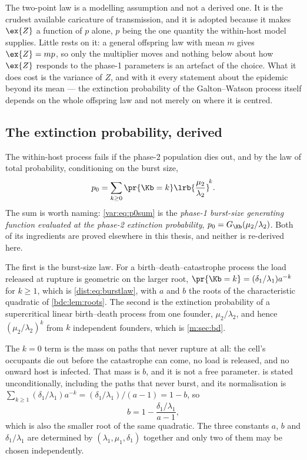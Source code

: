The two-point law is a modelling assumption and not a derived one. It is the
crudest available caricature of transmission, and it is adopted because it
makes $\ex{Z}$ a function of $p$ alone, $p$ being the one quantity the
within-host model supplies. Little rests on it: a general offspring law with
mean $m$ gives $\ex{Z}=mp$, so only the multiplier moves and nothing below
about how $\ex{Z}$ responds to the phase-1 parameters is an artefact of the
choice. What it does cost is the variance of $Z$, and with it every statement
about the epidemic beyond its mean --- the extinction probability of the
Galton--Watson process itself depends on the whole offspring law and not
merely on where it is centred.

\subsection{The extinction probability, derived}
\label{var:sec:extinction}

The within-host process fails if the phase-2 population dies out, and by the
law of total probability, conditioning on the burst size,
\begin{equation}
p_0=\sum_{k\ge0}\pr{\Kb=k}\lrb{\frac{\mu_2}{\lambda_2}}^{\!k}.
\label{var:eq:p0sum}
\end{equation}
The sum is worth naming: \cref{var:eq:p0sum} is the \emph{phase-1 burst-size
generating function evaluated at the phase-2 extinction probability},
$p_0=G_{\Kb}(\mu_2/\lambda_2)$. Both of its ingredients are proved elsewhere
in this thesis, and neither is re-derived here.

The first is the burst-size law. For a birth--death--catastrophe process the
load released at rupture is geometric on the larger root,
$\pr{\Kb=k}=(\delta_1/\lambda_1)a^{-k}$ for $k\ge1$, which is
\cref{dist:eq:burstlaw}, with $a$ and $b$ the roots of the characteristic
quadratic of \cref{bdc:lem:roots}. The second is the extinction probability
of a supercritical linear birth--death process from one founder,
$\mu_2/\lambda_2$, and hence $(\mu_2/\lambda_2)^k$ from $k$ independent
founders, which is \cref{m:sec:bd}.

The $k=0$ term is the mass on paths that never rupture at all: the cell's
occupants die out before the catastrophe can come, no load is released, and
no onward host is infected. That mass is $b$, and it is not a free
parameter.
 is stated unconditionally, including the paths that
never burst, and its normalisation is
$\sum_{k\ge1}(\delta_1/\lambda_1)a^{-k}=(\delta_1/\lambda_1)/(a-1)=1-b$, so
\begin{equation}
b=1-\frac{\delta_1/\lambda_1}{a-1},
\label{var:eq:bdetermined}
\end{equation}
which is also the smaller root of the same quadratic. The three constants
$a$, $b$ and $\delta_1/\lambda_1$ are determined by $(\lambda_1,\mu_1,\delta_1)$
together and only two of them may be chosen independently.


